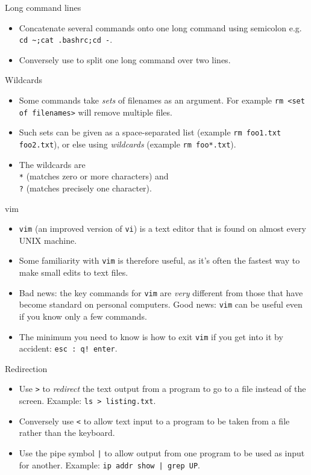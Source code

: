 \documentclass[dvipsnames]{beamer}
\newcommand{\command}[1]{\colorbox{light-gray}{\texttt{#1}}}
\begin{document}
\begin{frame}{Long command lines}
  \begin{itemize}
  \item Concatenate several commands onto one long command using semicolon e.g. \command{cd \textasciitilde;cat .bashrc;cd -}.
  \item Conversely use \command{} to split one long command over two lines.
  \end{itemize}
\end{frame}


\begin{frame}{Wildcards}
  \begin{itemize}
  \item Some commands take \textit{sets} of filenames as an argument. For example \command{rm <set of filenames>} will remove multiple files.
  \item Such sets can be given as a space-separated list (example \command{rm foo1.txt foo2.txt}), or else using \textit{wildcards} (example \command{rm foo*.txt}).
  \item The wildcards are \\ \command{*} (matches zero or more characters) and \\ \command{?} (matches precisely one character).
  \end{itemize}
\end{frame}


\begin{frame}{vim}
  \begin{itemize}
  \item \command{vim} (an improved version of \command{vi}) is a text editor that is found on almost every UNIX machine.
  \item Some familiarity with \command{vim} is therefore useful, as it's often the fastest way to make small edits to text files.
  \item Bad news: the key commands for \command{vim} are \textit{very} different from those that have become standard on personal computers. Good news:  \command{vim} can be useful even if you know only a few commands.
  \item The minimum you need to know is how to exit \command{vim} if you get into it by accident: \command{esc : q! enter}.
  \end{itemize}
\end{frame}


\begin{frame}{Redirection}
  \begin{itemize}
  \item Use \command{>} to \textit{redirect} the text output from a program to go to a file instead of the screen. Example: \command{ls >  listing.txt}.
  \item Conversely use \command{<} to allow text input to a program to be taken from a file rather than the keyboard.
  \item Use the pipe symbol \command{|} to allow output from one program to be used as input for another. Example: \command{ip addr show | grep UP}.
  \end{itemize}
\end{frame}
\end{document}
